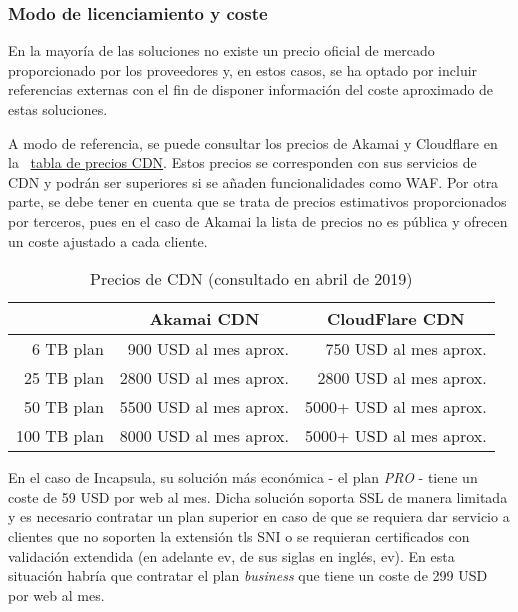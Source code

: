 \subsubsection{Modo de licenciamiento y coste}
\label{subsec:wafsaaslic}
\par En la mayoría de las soluciones no existe un precio oficial de mercado proporcionado por los proveedores y, en estos casos, se ha optado por
incluir referencias externas con el fin de disponer información del coste aproximado de estas soluciones.
\par A modo de referencia, se puede consultar los precios de Akamai y Cloudflare en la {~\hyperref[tab:precioscdn]{tabla de precios CDN}}.
Estos precios se corresponden con sus servicios de CDN y podrán ser superiores si se añaden funcionalidades como WAF. Por otra parte, se debe
tener en cuenta que se trata de precios estimativos proporcionados por terceros, pues en el caso de Akamai la lista de precios no es pública y
ofrecen un coste ajustado a cada cliente.
\begin{table}[h!]
  \centering
  \label{tab:precioscdn}
  \begin{tabular}{rrr}
     &
    \multicolumn{1}{c}{\textbf{Akamai CDN}} &
    \multicolumn{1}{c}{\textbf{CloudFlare CDN}} \\
    \hline \hline
    6 TB plan   & 900  USD al mes aprox.  & 750   USD al mes aprox. \\
    \hline
    25 TB plan  & 2800 USD al mes aprox.  & 2800  USD al mes aprox. \\
    \hline
    50 TB plan  & 5500 USD al mes aprox.  & 5000+ USD al mes aprox. \\
    \hline
    100 TB plan & 8000 USD al mes aprox.  & 5000+ USD al mes aprox. \\
    \hline
  \end{tabular}
  \caption{Precios de CDN\cite{cdnprices} (consultado en abril de 2019)}
\end{table}

\par En el caso de Incapsula, su solución más económica - el plan {\em PRO} -  tiene un coste de 59 USD por web al mes\cite{incapsulaprices}.
Dicha solución soporta SSL de manera limitada y es necesario contratar un plan superior en caso de que se requiera dar servicio a clientes que
no soporten la extensión \acrshort{tls} \acrshort{SNI} o se requieran certificados con validación extendida (en adelante \acrshort{ev}, de sus siglas en
inglés, \acrlong{ev}). En esta situación habría que contratar el plan {\em business} que tiene un coste de 299 USD por web al
mes\cite{incapsulaprices}.

